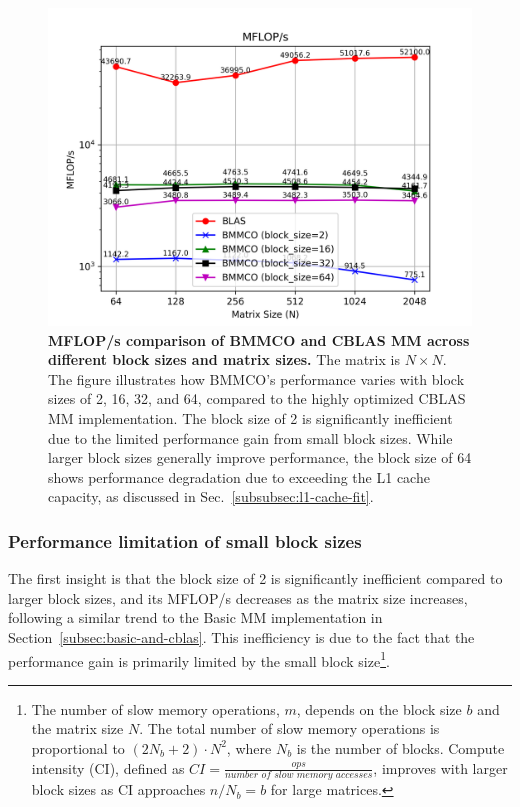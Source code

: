 \begin{figure}[htbp]
    \centering
    \includegraphics[width=1.0\linewidth]{images/BMMCO-and-CBLAS_MFLOPs.png}
    \caption{\textbf{MFLOP/s comparison of BMMCO and CBLAS MM across different block sizes and matrix sizes.} The matrix is \(N \times N\). The figure illustrates how BMMCO's performance varies with block sizes of 2, 16, 32, and 64, compared to the highly optimized CBLAS MM implementation. The block size of 2 is significantly inefficient due to the limited performance gain from small block sizes. While larger block sizes generally improve performance, the block size of 64 shows performance degradation due to exceeding the L1 cache capacity, as discussed in Sec.~\ref{subsubsec:l1-cache-fit}.}
    \label{fig:mflops-BMMCO-CBLAS}
\end{figure}

\subsubsection{Performance limitation of small block sizes}
\label{subsubsec:blocking-overhead}
The first insight is that the block size of 2 is significantly inefficient compared to larger block sizes, and its MFLOP/s decreases as the matrix size increases, following a similar trend to the Basic MM implementation in Section~\ref{subsec:basic-and-cblas}. This inefficiency is due to the fact that the performance gain is primarily limited by the small block size\footnote{The number of slow memory operations, \(m\), depends on the block size \(b\) and the matrix size \(N\). The total number of slow memory operations is proportional to \((2N_b + 2) \cdot N^2\), where \(N_b\) is the number of blocks. Compute intensity (CI), defined as \(CI = \frac{\textit{ops}}{\textit{number of slow memory accesses}}\), improves with larger block sizes as CI approaches \(n/N_b = b\) for large matrices.}.

